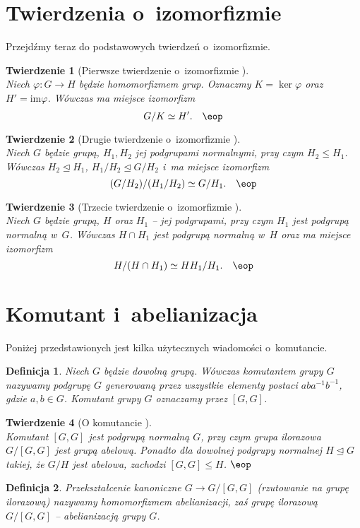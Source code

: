 \documentclass[licencjacka]{pracamgr}
\newtheorem{deff}{Definicja}[section]
\newtheorem{thh}{Twierdzenie}[section]
\begin{document}
\section{Twierdzenia o~izomorfizmie}
Przejdźmy teraz do podstawowych twierdzeń o~izomorfizmie.
\begin{thh}[{Pierwsze twierdzenie o~izomorfizmie \cite[tw. 4.5.]{BB}}] $ $ \\
    Niech $ \varphi \colon G \to H$ będzie homomorfizmem grup. Oznaczmy $K = \ker{\varphi}$ oraz
    $H' = \mathrm{im}\varphi $. 
    Wówczas ma miejsce izomorfizm $$G/K \simeq H'.\quad\eop$$
\end{thh}
\begin{thh}[{Drugie twierdzenie o~izomorfizmie \cite[tw. 4.6. a)]{BB}}]$ $\\
    Niech $G$ będzie grupą,  $H_1, H_2$ jej podgrupami normalnymi,
    przy czym $H_2 \leq H_1$. 
    Wówczas $H_2 \trianglelefteq H_1$, $H_1/H_2 \trianglelefteq G/H_2$ i~ma miejsce izomorfizm
    $$ (G/H_2) / (H_1/H_2) \simeq G/H_1.\quad\eop$$
\end{thh}
\begin{thh}[{Trzecie twierdzenie o~izomorfizmie \cite[tw. 4.6. b)]{BB}}] $ $ \\
    Niech $G$ będzie grupą, $H$ oraz $H_1$
    -- jej podgrupami, przy czym $H_1$ jest podgrupą normalną w~$G$. 
    Wówczas $H\cap H_1$ jest podgrupą normalną w~$H$ oraz ma miejsce izomorfizm
    $$ H/(H\cap H_1) \simeq HH_1 / H_1.\quad\eop$$
\end{thh}


\section{Komutant i~abelianizacja}
Poniżej przedstawionych jest kilka użytecznych wiadomości
o~komutancie.
\begin{deff}
    Niech $G$ będzie dowolną grupą. Wówczas \emph{komutantem grupy $G$} nazywamy podgrupę $G$ generowaną przez wszystkie elementy postaci
    $aba^{-1}b^{-1}$, gdzie $a, b \in G$. Komutant grupy $G$ oznaczamy przez $[G, G]$.
\end{deff}
\begin{thh}[{O komutancie \cite[tw. 7.3. - 7.5.]{BB}}] $ $\\
    Komutant $[G,G]$ jest podgrupą normalną $G$, przy czym grupa ilorazowa $G/[G,G]$ jest grupą abelową.
    Ponadto dla dowolnej podgrupy normalnej $H \trianglelefteq G$ takiej, że $G/H$ jest abelowa, zachodzi $[G,G] \le H$.
    \quad$\eop$
\end{thh}
\begin{deff}
    Przekształcenie kanoniczne $G \to G/[G,G]$ (rzutowanie na grupę ilorazową) nazywamy
    homomorfizmem abelianizacji, zaś grupę ilorazową $G/[G,G]$ -- abelianizacją grupy $G$.
\end{deff}
\end{document}

